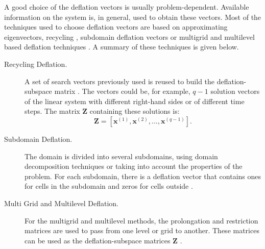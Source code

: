 \documentclass[12pt]{article}
\begin{document}
A good choice of the deflation vectors is usually problem-dependent. Available information on the system is, in general,
used to obtain these vectors.
Most of the techniques used to choose deflation vectors are based on approximating eigenvectors, 
recycling \cite{Clemens04}, subdomain deflation vectors \cite{Vuik02} or multigrid and multilevel based deflation techniques \cite{Tang09,Smith96}. A summary of these techniques is given below.
\begin{description}
 \item [Recycling Deflation.] A set of search vectors previously used is reused to build the deflation-subspace 
 matrix \cite{Clemens04}. 
The vectors could be, for example, $q-1$
solution vectors of the linear system with different right-hand sides or of different time steps.
The matrix $\mathbf{Z}$ containing these solutions is:
$$\mathbf{Z}=[\mathbf{x}^{(1)},\mathbf{x}^{(2)},...,\mathbf{x}^{(q-1)}].$$
 \item [Subdomain Deflation.] The domain is divided into several subdomains,
 using domain decomposition techniques or taking into account the properties of the problem.
For each subdomain, there is a deflation vector that contains ones for cells in the subdomain and zeros for cells outside \cite{Vuik02}.
 \item [Multi Grid and Multilevel Deflation.] For the multigrid and multilevel methods, 
 the prolongation and restriction matrices are used to pass from one level or grid to another. 
These matrices can be used as the deflation-subspace matrices $\mathbf{Z}$ \cite{Tang09}.
\end{description}
\newpage
\end{document}
